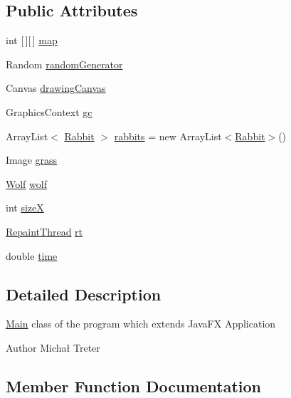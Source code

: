 \subsection*{Public Attributes}
\begin{DoxyCompactItemize}
\item 
int \mbox{[}$\,$\mbox{]}\mbox{[}$\,$\mbox{]} \hyperlink{classsample_1_1_main_a3c889cc347cd6f3c1304d49d59e017e2}{map}
\item 
Random \hyperlink{classsample_1_1_main_aa2761a84f13a2da2af9382da036fb8c2}{random\+Generator}
\item 
Canvas \hyperlink{classsample_1_1_main_abc6b5d52c470cad08159bc670d3cf91b}{drawing\+Canvas}
\item 
Graphics\+Context \hyperlink{classsample_1_1_main_a179ba2f59a5607db1529380c65a71d7d}{gc}
\item 
Array\+List$<$ \hyperlink{classsample_1_1_rabbit}{Rabbit} $>$ \hyperlink{classsample_1_1_main_acd6e55598950bbd7e3b1677620ac458f}{rabbits} = new Array\+List$<$\hyperlink{classsample_1_1_rabbit}{Rabbit}$>$()
\item 
Image \hyperlink{classsample_1_1_main_adf52f45996c28f1b8d69b9e7d3694338}{grass}
\item 
\hyperlink{classsample_1_1_wolf}{Wolf} \hyperlink{classsample_1_1_main_ad107bdae7a63af044e8504ecbe14f8cf}{wolf}
\item 
int \hyperlink{classsample_1_1_main_ae1a64fcdcc58b34ad0fc433328dd2470}{sizeX}
\item 
\hyperlink{classsample_1_1_repaint_thread}{Repaint\+Thread} \hyperlink{classsample_1_1_main_ad45209d84c8ed6bb0f012ea1713e4afc}{rt}
\item 
double \hyperlink{classsample_1_1_main_ab8abfee15ab924585e78d876b3b36f15}{time}
\end{DoxyCompactItemize}


\subsection{Detailed Description}
\hyperlink{classsample_1_1_main}{Main} class of the program which extends Java\+FX Application \begin{DoxyAuthor}{Author}
Michał Treter 
\end{DoxyAuthor}


\subsection{Member Function Documentation}
\mbox{\label{classsample_1_1_main_aaa12a3fda87745c46cc6a3b2fbbb55ee}} 
